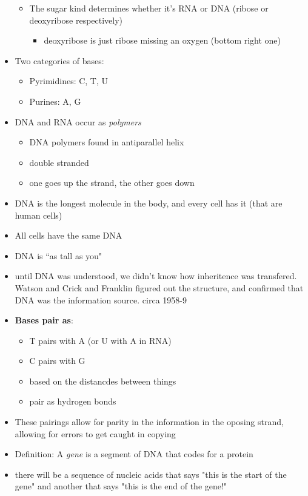\documentclass{article}
\theoremstyle{definition}
\begin{document}
\begin{itemize}
\begin{itemize}
			\item The sugar kind determines whether it's RNA or DNA (ribose or deoxyribose respectively)
				\begin{itemize}
					\item deoxyribose is just ribose missing an oxygen (bottom right one)
				\end{itemize}
		\end{itemize}
	\item Two categories of bases:
		\begin{itemize}
			\item Pyrimidines: C, T, U
			\item Purines: A, G
		\end{itemize}
	\item DNA and RNA occur as \textit{polymers}
		\begin{itemize}
			\item DNA polymers found in antiparallel helix
			\item double stranded
			\item one goes up the strand, the other goes down
		\end{itemize}
	\item DNA is the longest molecule in the body, and every cell has it (that are human cells)
	\item All cells have the same DNA
	\item DNA is ``as tall as you"
	\item until DNA was understood, we didn't know how inheritence was transfered. Watson and Crick and Franklin figured out the structure, and confirmed that DNA was the information source. circa 1958-9
	\item \textbf{Bases pair as}:
		\begin{itemize}
			\item T pairs with A (or U with A in RNA)
			\item C pairs with G
			\item based on the distancdes between things
			\item pair as hydrogen bonds
		\end{itemize}
	\item These pairings allow for parity in the information in the oposing strand, allowing for errors to get caught in copying
	\item Definition: A \textit{gene} is a segment of DNA that codes for a protein
	\item there will be a sequence of nucleic acids that says "this is the start of the gene" and another that says "this is the end of the gene!"

\end{itemize}
\end{document}
